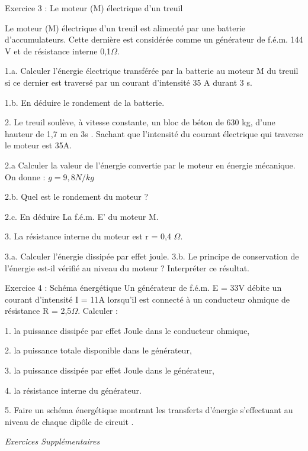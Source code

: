 \documentclass[12pt, french]{article}
\begin{document}
\begin{Box2}{Exercice 3 :  Le moteur (M) électrique d’un treuil }

   Le moteur (M) électrique d’un treuil est alimenté par une batterie d’accumulateurs. Cette dernière est considérée comme un générateur de f.é.m. 144 V et de résistance interne 0,1$\Omega$.

1.a. Calculer l’énergie électrique transférée par la batterie au moteur M du treuil si ce dernier est traversé par un courant d’intensité 35 A durant 3 s.

1.b. En déduire le rondement de la batterie.

2. Le treuil soulève, à vitesse constante, un bloc de béton de 630 kg, d’une hauteur de 1,7 m en 3s . Sachant que l’intensité du courant électrique qui traverse le moteur est 35A.

2.a  Calculer la valeur de l’énergie convertie par le moteur en énergie mécanique.
On donne : $g = 9,8 N/kg$

2.b. Quel est le rondement du moteur ?

2.c. En déduire La f.é.m. E’ du moteur M.

3. La résistance interne du moteur est r = 0,4 $\Omega$.

3.a. Calculer l’énergie dissipée par effet joule.
3.b. Le principe de conservation de l’énergie est-il vérifié au niveau du moteur ? Interpréter ce
résultat.
\end{Box2}


\begin{Box2}{Exercice 4 : Schéma énergétique}
   Un générateur de f.é.m. E = 33V débite un courant d’intensité I = 11A lorsqu’il est connecté à un conducteur
ohmique de résistance R = 2,5$\Omega$. Calculer :

   1. la puissance dissipée par effet Joule dans le conducteur ohmique,

   2. la puissance totale disponible dans le générateur,

   3. la puissance dissipée par effet Joule dans le générateur,

   4. la résistance interne du générateur.

   5. Faire un schéma énergétique montrant les transferts d’énergie s’effectuant au niveau de chaque dipôle de
circuit .
\end{Box2}
\begin{center}
   \Large{ \em{Exercices Supplémentaires}}
\end{center}
\end{document}
